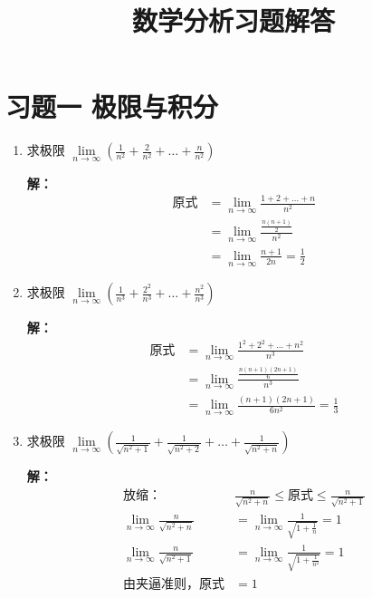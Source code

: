 \documentclass[12pt,a4paper]{article}
\title{\textbf{数学分析习题解答}}
\author{}
\date{}
\newcommand{\Lim}[2]{\lim\limits_{#1 \to #2}}
\begin{document}
\maketitle
\thispagestyle{empty}

\section*{习题一 极限与积分}

\begin{enumerate}[label=\textbf{\arabic*.}, leftmargin=*, itemsep=1.2em]

\item 求极限 $\displaystyle \Lim{n}{\infty} \left( \frac{1}{n^2} + \frac{2}{n^2} + \dots + \frac{n}{n^2} \right)$

\textbf{解：}
\begin{align*}
\text{原式} &= \Lim{n}{\infty} \frac{1+2+\dots+n}{n^2} \\
&= \Lim{n}{\infty} \frac{\frac{n(n+1)}{2}}{n^2} \\
&= \Lim{n}{\infty} \frac{n+1}{2n} = \frac{1}{2}
\end{align*}

\item 求极限 $\displaystyle \Lim{n}{\infty} \left( \frac{1}{n^3} + \frac{2^2}{n^3} + \dots + \frac{n^2}{n^3} \right)$

\textbf{解：}
\begin{align*}
\text{原式} &= \Lim{n}{\infty} \frac{1^2+2^2+\dots+n^2}{n^3} \\
&= \Lim{n}{\infty} \frac{\frac{n(n+1)(2n+1)}{6}}{n^3} \\
&= \Lim{n}{\infty} \frac{(n+1)(2n+1)}{6n^2} = \frac{1}{3}
\end{align*}

\item 求极限 $\displaystyle \Lim{n}{\infty} \left( \frac{1}{\sqrt{n^2+1}} + \frac{1}{\sqrt{n^2+2}} + \dots + \frac{1}{\sqrt{n^2+n}} \right)$

\textbf{解：}
\begin{align*}
\text{放缩：} \quad & \frac{n}{\sqrt{n^2+n}} \leq \text{原式} \leq \frac{n}{\sqrt{n^2+1}} \\
\Lim{n}{\infty} \frac{n}{\sqrt{n^2+n}} &= \Lim{n}{\infty} \frac{1}{\sqrt{1+\frac{1}{n}}} = 1 \\
\Lim{n}{\infty} \frac{n}{\sqrt{n^2+1}} &= \Lim{n}{\infty} \frac{1}{\sqrt{1+\frac{1}{n^2}}} = 1 \\
\text{由夹逼准则，原式} &= 1
\end{align*}


\end{enumerate}
\end{document}
